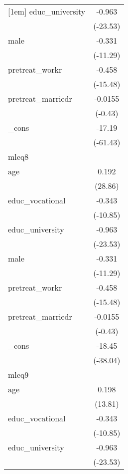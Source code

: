{\begin{tabular}{l*{1}{c}}
[1em]
educ\_university&      -0.963\sym{***}\\
            &    (-23.53)         \\
[1em]
male        &      -0.331\sym{***}\\
            &    (-11.29)         \\
[1em]
pretreat\_workr&      -0.458\sym{***}\\
            &    (-15.48)         \\
[1em]
pretreat\_marriedr&     -0.0155         \\
            &     (-0.43)         \\
[1em]
\_cons      &      -17.19\sym{***}\\
            &    (-61.43)         \\
\hline
mleq8       &                     \\
age         &       0.192\sym{***}\\
            &     (28.86)         \\
[1em]
educ\_vocational&      -0.343\sym{***}\\
            &    (-10.85)         \\
[1em]
educ\_university&      -0.963\sym{***}\\
            &    (-23.53)         \\
[1em]
male        &      -0.331\sym{***}\\
            &    (-11.29)         \\
[1em]
pretreat\_workr&      -0.458\sym{***}\\
            &    (-15.48)         \\
[1em]
pretreat\_marriedr&     -0.0155         \\
            &     (-0.43)         \\
[1em]
\_cons      &      -18.45\sym{***}\\
            &    (-38.04)         \\
\hline
mleq9       &                     \\
age         &       0.198\sym{***}\\
            &     (13.81)         \\
[1em]
educ\_vocational&      -0.343\sym{***}\\
            &    (-10.85)         \\
[1em]
educ\_university&      -0.963\sym{***}\\
            &    (-23.53)         \\
[1em]

\end{tabular}}
